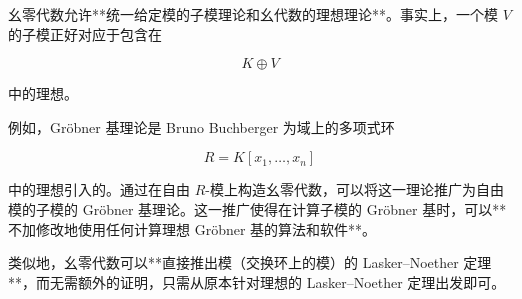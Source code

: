 幺零代数允许**统一给定模的子模理论和幺代数的理想理论**。事实上，一个模 $V$ 的子模正好对应于包含在

$$
K \oplus V
$$

中的理想。

例如，Gröbner 基理论是 Bruno Buchberger 为域上的多项式环

$$
R = K[x_1, \dots, x_n]
$$

中的理想引入的。通过在自由 $R$-模上构造幺零代数，可以将这一理论推广为自由模的子模的 Gröbner 基理论。这一推广使得在计算子模的 Gröbner 基时，可以**不加修改地使用任何计算理想 Gröbner 基的算法和软件**。

类似地，幺零代数可以**直接推出模（交换环上的模）的 Lasker–Noether 定理**，而无需额外的证明，只需从原本针对理想的 Lasker–Noether 定理出发即可。
